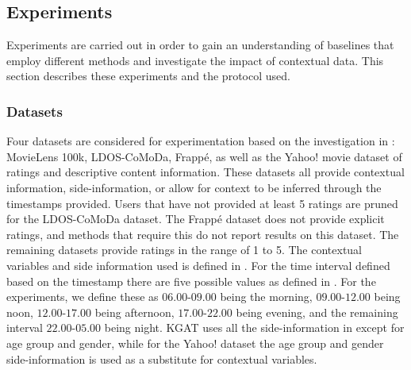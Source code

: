 \subsection{Experiments}\label{subsec:experimentprotocol}
Experiments are carried out in order to gain an understanding of baselines that employ different methods and investigate the impact of contextual data.
This section describes these experiments and the protocol used.

\subsubsection{Datasets}
Four datasets are considered for experimentation based on the investigation in : MovieLens 100k, LDOS-CoMoDa, Frappé, as well as the Yahoo! movie dataset of ratings and descriptive content information\cite{Yahoo!-movie}.
These datasets all provide contextual information, side-information, or allow for context to be inferred through the timestamps provided.
Users that have not provided at least 5 ratings are pruned for the LDOS-CoMoDa dataset.
The Frappé dataset does not provide explicit ratings, and methods that require this do not report results on this dataset.
The remaining datasets provide ratings in the range of 1 to 5.
The contextual variables and side information used is defined in .
For the time interval defined based on the timestamp there are five possible values as defined in .
For the experiments, we define these as $06.00$-$09.00$ being the morning, $09.00$-$12.00$ being noon, $12.00$-$17.00$ being afternoon, $17.00$-$22.00$ being evening, and the remaining interval $22.00$-$05.00$ being night.
KGAT uses all the side-information in  except for age group and gender, while for the Yahoo! dataset the age group and gender side-information is used as a substitute for contextual variables. 
\\

